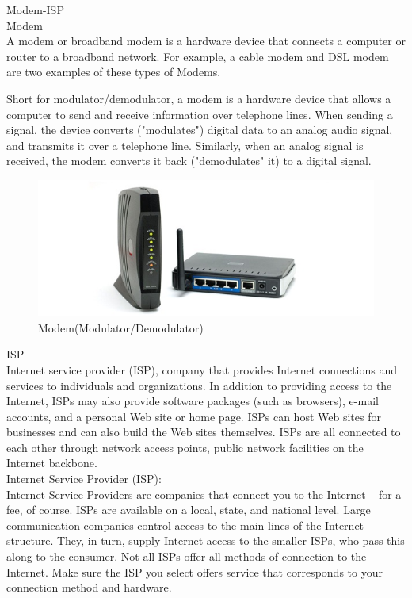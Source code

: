\documentclass[11pt,a4paper,twoside]{article}
\begin{document}
Modem-ISP\\
Modem\\
A modem or broadband modem is a hardware device that connects a computer or router to a broadband network. For example, a cable modem and DSL modem are two examples of these types of Modems.\par
Short for modulator/demodulator, a modem is a hardware device that allows a computer to send and receive information over telephone lines. When sending a signal, the device converts ("modulates") digital data to an analog audio signal, and transmits it over a telephone line. Similarly, when an analog signal is received, the modem converts it back ("demodulates" it) to a digital signal.
 \begin{figure}[H]
\includegraphics[width=1\textwidth]{Fig 34.jpg}
\caption{Modem(Modulator/Demodulator)}
\end{figure}
ISP\\
Internet service provider (ISP), company that provides Internet connections and services to individuals and organizations. In addition to providing access to the Internet, ISPs may also provide software packages (such as browsers), e-mail accounts, and a personal Web site or home page. ISPs can host Web sites for businesses and can also build the Web sites themselves. ISPs are all connected to each other through network access points, public network facilities on the Internet backbone.\\
Internet Service Provider (ISP):\\
Internet Service Providers are companies that connect you to the Internet – for a fee, of course. ISPs are available on a local, state, and national level. Large communication companies control access to the main lines of the Internet structure. They, in turn, supply Internet access to the smaller ISPs, who pass this along to the consumer. Not all ISPs offer all methods of connection to the Internet. Make sure the ISP you select offers service that corresponds to your connection method and hardware.\\
\end{document}
